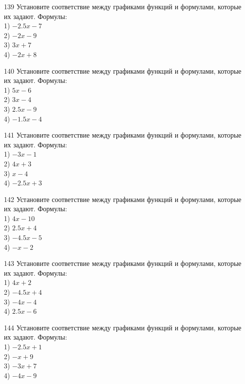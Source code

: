 \documentclass[4apaper]{article}
\begin{document}
\begin{taskBN}{139}
Установите соответствие между графиками функций и формулами, которые их задают. Формулы: \\1) $-2.5x-7$\\2) $-2x-9$\\3) $3x+7$\\4) $-2x+8$
\end{taskBN}

\begin{taskBN}{140}
Установите соответствие между графиками функций и формулами, которые их задают. Формулы: \\1) $5x-6$\\2) $3x-4$\\3) $2.5x-9$\\4) $-1.5x-4$
\end{taskBN}

\begin{taskBN}{141}
Установите соответствие между графиками функций и формулами, которые их задают. Формулы: \\1) $-3x-1$\\2) $4x+3$\\3) $x-4$\\4) $-2.5x+3$
\end{taskBN}

\begin{taskBN}{142}
Установите соответствие между графиками функций и формулами, которые их задают. Формулы: \\1) $4x-10$\\2) $2.5x+4$\\3) $-4.5x-5$\\4) $-x-2$
\end{taskBN}

\begin{taskBN}{143}
Установите соответствие между графиками функций и формулами, которые их задают. Формулы: \\1) $4x+2$\\2) $-4.5x+4$\\3) $-4x-4$\\4) $2.5x-6$
\end{taskBN}

\begin{taskBN}{144}
Установите соответствие между графиками функций и формулами, которые их задают. Формулы: \\1) $-2.5x+1$\\2) $-x+9$\\3) $-3x+7$\\4) $-4x-9$
\end{taskBN}
\end{document}
